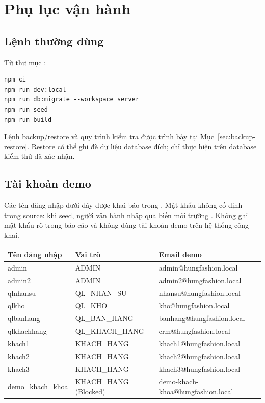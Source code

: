 \appendix
\chapter{Phụ lục vận hành}
\section{Lệnh thường dùng}
Từ thư mục \texttt{}:
\begin{verbatim}
npm ci
npm run dev:local
npm run db:migrate --workspace server
npm run seed
npm run build
\end{verbatim}
Lệnh backup/restore và quy trình kiểm tra được trình bày tại Mục~\ref{sec:backup-restore}. Restore có thể ghi đè dữ liệu database đích; chỉ thực hiện trên database kiểm thử đã xác nhận.

\section{Tài khoản demo}
Các tên đăng nhập dưới đây được khai báo trong \texttt{}. Mật khẩu không cố định trong source: khi seed, người vận hành nhập qua biến môi trường \texttt{}. Không ghi mật khẩu rõ trong báo cáo và không dùng tài khoản demo trên hệ thống công khai.
\small
\begin{longtable}{|p{}|p{}|p{}|}\hline
\textbf{Tên đăng nhập}&\textbf{Vai trò}&\textbf{Email demo}\\\hline\endhead
admin&ADMIN&admin@hungfashion.local\\\hline
admin2&ADMIN&admin2@hungfashion.local\\\hline
qlnhansu&QL\_NHAN\_SU&nhansu@hungfashion.local\\\hline
qlkho&QL\_KHO&kho@hungfashion.local\\\hline
qlbanhang&QL\_BAN\_HANG&banhang@hungfashion.local\\\hline
qlkhachhang&QL\_KHACH\_HANG&crm@hungfashion.local\\\hline
khach1&KHACH\_HANG&khach1@hungfashion.local\\\hline
khach2&KHACH\_HANG&khach2@hungfashion.local\\\hline
khach3&KHACH\_HANG&khach3@hungfashion.local\\\hline
demo\_khach\_khoa&KHACH\_HANG (Blocked)&demo-khach-khoa@hungfashion.local\\\hline
\end{longtable}
\normalsize

